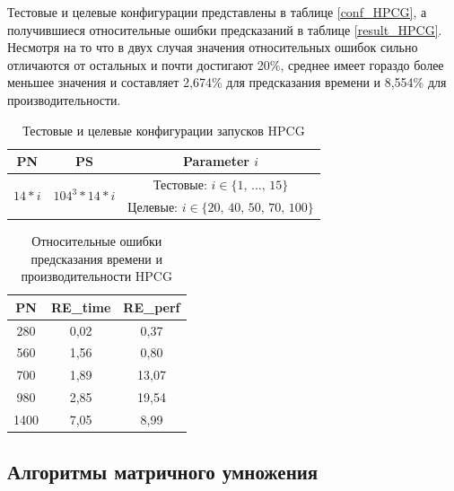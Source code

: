 	Тестовые и целевые конфигурации представлены в таблице \eqref{conf_HPCG}, а получившиеся относительные ошибки предсказаний в таблице \eqref{result_HPCG}. Несмотря на то что в двух случая значения относительных ошибок сильно отличаются от остальных и почти достигают 20\%, среднее имеет гораздо более меньшее значения и составляет 2,674\% для предсказания времени и 8,554\% для производительности.
	\begin{table}
		\centering
		\begin{tabular}{|c|c|c|}
			\hline
			PN                          & PS                                 & Parameter \(i\)                                 \\ \hline
			\multirow{2}{*}{\(14 * i\)} & \multirow{2}{*}{\(104^3 * 14 *i\)} & Тестовые: \(i \in \{1,\,\ldots,\,15\}\)         \\ \cline{3-3}
			                            &                                    & Целевые:  \(i \in \{20,\,40,\,50,\,70,\,100\}\) \\ \hline
		\end{tabular}
		\caption{Тестовые и целевые конфигурации запусков HPCG}
		\label{conf_HPCG}
	\end{table}
	\begin{table}
		\centering
		\begin{tabular}{|c|c|c|}
			\hline
			PN   & RE\_time & RE\_perf \\ \hline
			280	 & 0,02     & 0,37     \\ \hline
			560	 & 1,56     & 0,80     \\ \hline
			700	 & 1,89     & 13,07    \\ \hline
			980	 & 2,85     & 19,54    \\ \hline
			1400 & 7,05     & 8,99     \\ \hline
		\end{tabular}
		\caption{Относительные ошибки предсказания времени и производительности HPCG}
		\label{result_HPCG}
	\end{table}

	\subsection{Алгоритмы матричного умножения}
